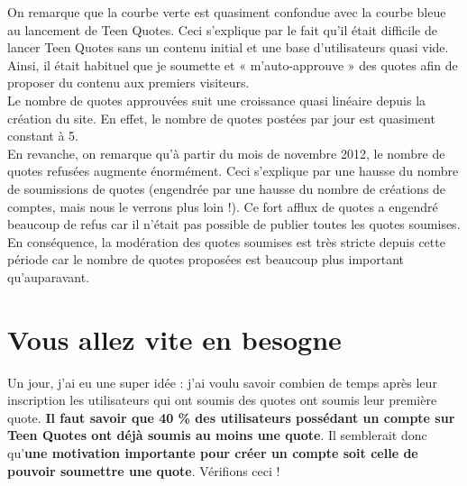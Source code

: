 \documentclass{report}
\begin{document}
	On remarque que la courbe verte est quasiment confondue avec la courbe bleue au lancement de Teen Quotes. Ceci s'explique par le fait qu'il était difficile de lancer Teen Quotes sans un contenu initial et une base d'utilisateurs quasi vide. Ainsi, il était habituel que je soumette et « m'auto-approuve » des quotes afin de proposer du contenu aux premiers visiteurs.\\

	Le nombre de quotes approuvées suit une croissance quasi linéaire depuis la création du site. En effet, le nombre de quotes postées par jour est quasiment constant à 5.\\

	En revanche, on remarque qu'à partir du mois de novembre 2012, le nombre de quotes refusées augmente énormément. Ceci s'explique par une hausse du nombre de soumissions de quotes (engendrée par une hausse du nombre de créations de comptes, mais nous le verrons plus loin !). Ce fort afflux de quotes a engendré beaucoup de refus car il n'était pas possible de publier toutes les quotes soumises. En conséquence, la modération des quotes soumises est très stricte depuis cette période car le nombre de quotes proposées est beaucoup plus important qu'auparavant.

	\section{Vous allez vite en besogne}
	Un jour, j'ai eu une super idée : j'ai voulu savoir combien de temps après leur inscription les utilisateurs qui ont soumis des quotes ont soumis leur première quote. \textbf{Il faut savoir que 40 \% des utilisateurs possédant un compte sur Teen Quotes ont déjà soumis au moins une quote}. Il semblerait donc qu'\textbf{une motivation importante pour créer un compte soit celle de pouvoir soumettre une quote}. Vérifions ceci !
\end{document}
